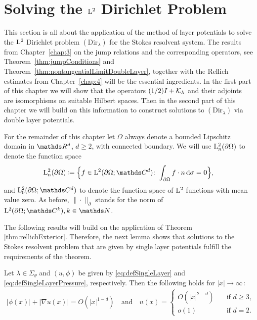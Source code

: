 \chapter{Solving the $\mathrm{L}^2$ Dirichlet Problem}
\label{chap:5}

This section is all about the application of the method of layer potentials to solve the $\mathrm{L}^2$ Dirichlet problem \hyperref[eq:dirProblem]{$(\mathrm{Dir}_\lambda)$} for the Stokes resolvent system.
The results from Chapter~\ref{chap:3} on the jump relations and the corresponding operators, see Theorem~\ref{thm:jumpConditions} and Theorem~\ref{thm:nontangentialLimitDoubleLayer}, together with the Rellich estimates from Chapter~\ref{chap:4} will be the essential ingredients.
In the first part of this chapter we will show that the operators $(1/2)I + \mathcal{K}_\lambda$ and their adjoints are isomorphisms on suitable Hilbert spaces.
Then in the second part of this chapter we will build on this information to construct solutions to $(\mathrm{Dir}_\lambda)$ via double layer potentials.

For the remainder of this chapter let $\Omega$ always denote a bounded Lipschitz domain in $\R^d$, $d \geq 2$, with connected boundary.
We will use $\mathrm{L}^2_n(\partial\Omega)$ to denote the function space
\begin{align*}
  \Ell^2_n(\partial\Omega) \coloneqq \Big\{ f \in \Ell^2(\partial\Omega; \C^d) \colon \int_{\partial\Omega} f \cdot n \d \sigma = 0 \Big\},
\end{align*}
and $\Ell_0^2(\partial\Omega; \C^d)$  to denote the function space of $\mathrm{L}^2$ functions with mean value zero.
As before, $\| \cdot \|^{}_\partial$ stands for the norm of $\Ell^2(\partial\Omega; \C^k), k \in \N$.

The following results will build on the application of Theorem \ref{thm:rellichExterior}.
Therefore, the next lemma shows that solutions to the Stokes resolvent problem that are given by single layer potentials fulfill the requirements of the theorem.

\begin{lem}
  \label{lem:requirements}
  Let $\lambda \in \Sigma_\theta$ and $(u,\phi)$ be given by \eqref{eq:defSingleLayer} and \eqref{eq:defSingleLayerPressure}, respectively.
  Then the following holds for $|x| \to \infty\,$:
  \begin{align*}
    |\phi(x)| + |\nabla u(x)| = O(|x|^{1 - d}) \quad\text{and}\quad 
    u(x) = \begin{cases} O(|x|^{2 - d}) &\quad\text{if } d \geq 3, \\ o(1) &\quad\text{if } d = 2. \end{cases}
  \end{align*}
\end{lem}

